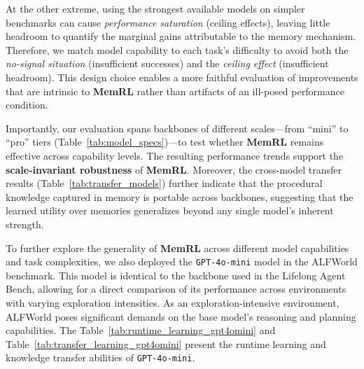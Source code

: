 \documentclass{article}
\theoremstyle{plain}
\theoremstyle{definition}
\theoremstyle{remark}
\begin{document}
At the other extreme, using the strongest available models on simpler benchmarks can cause \emph{performance saturation} (ceiling effects), leaving little headroom to quantify the marginal gains attributable to the memory mechanism. Therefore, we match model capability to each task's difficulty to avoid both the \emph{no-signal situation} (insufficient successes) and the \emph{ceiling effect} (insufficient headroom). This design choice enables a more faithful evaluation of improvements that are intrinsic to \textbf{MemRL} rather than artifacts of an ill-posed performance condition.

Importantly, our evaluation spans backbones of different scales---from ``mini'' to ``pro'' tiers (Table~\ref{tab:model_specs})---to test whether \textbf{MemRL} remains effective across capability levels. The resulting performance trends support the \textbf{scale-invariant robustness} of \textbf{MemRL}. Moreover, the cross-model transfer results (Table~\ref{tab:transfer_models}) further indicate that the procedural knowledge captured in memory is portable across backbones, suggesting that the learned utility over memories generalizes beyond any single model's inherent strength.

To further explore the generality of \textbf{MemRL} across different model capabilities and task complexities, we also deployed the \texttt{GPT-4o-mini} model in the ALFWorld benchmark. This model is identical to the backbone used in the Lifelong Agent Bench, allowing for a direct comparison of its performance across environments with varying exploration intensities. As an exploration-intensive environment, ALFWorld poses significant demands on the base model's reasoning and planning capabilities. The Table~\ref{tab:runtime_learning_gpt4omini} and Table~\ref{tab:transfer_learning_gpt4omini} present the runtime learning and knowledge transfer abilities of \texttt{GPT-4o-mini}.
\end{document}
